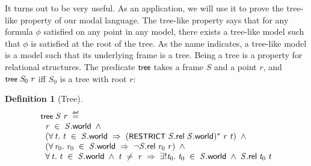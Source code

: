 \documentclass[letterpaper]{article}
\newtheorem{defn}{Definition}
\renewcommand{\HOLConst}[1]{{\textsf{\upshape\small #1}}}
\renewcommand{\HOLinline}[1]{\ensuremath{#1}}
\newenvironment{holmath}{\begin{displaymath}\begin{array}{l}}{\end{array}\end{displaymath}\ignorespacesafterend}
\begin{document}
It turns out to be very useful. As an application, we will use it to prove the tree-like property of our modal language. The tree-like property says that for any formula $\phi$ satisfied on any point in any model, there exists a tree-like model such that $\phi$ is satisfied at the root of the tree. As the name indicates, a tree-like model is a model such that its underlying frame is a tree. Being a tree is a property for relational structures. The predicate \HOLinline{\HOLConst{tree}} takes a frame $S$ and a point $r$, and \HOLinline{\HOLConst{tree}\;\HOLFreeVar{S\sb{\mathrm{0}}}\;\HOLFreeVar{r}} iff $S_0$ is a tree with root $r$:
\begin{defn}[Tree]
\begin{holmath}
   \HOLConst{tree}\;\HOLFreeVar{S}\;\HOLFreeVar{r}\;\HOLSymConst{\HOLTokenDefEquality{}}\\
\;\;\HOLFreeVar{r}\;\HOLSymConst{\HOLTokenIn{}}\;\HOLFreeVar{S}.\HOLFieldName{world}\;\HOLSymConst{\HOLTokenConj{}}\\
\;\;(\HOLSymConst{\HOLTokenForall{}}\HOLBoundVar{t}.\;\HOLBoundVar{t}\;\HOLSymConst{\HOLTokenIn{}}\;\HOLFreeVar{S}.\HOLFieldName{world}\;\HOLSymConst{\HOLTokenImp{}}\;(\HOLConst{RESTRICT}\;\HOLFreeVar{S}.\HOLFieldName{rel}\;\HOLFreeVar{S}.\HOLFieldName{world})\HOLSymConst{\HOLTokenSupStar{}}\;\HOLFreeVar{r}\;\HOLBoundVar{t})\;\HOLSymConst{\HOLTokenConj{}}\\
\;\;(\HOLSymConst{\HOLTokenForall{}}\HOLBoundVar{r\sb{\mathrm{0}}}.\;\HOLBoundVar{r\sb{\mathrm{0}}}\;\HOLSymConst{\HOLTokenIn{}}\;\HOLFreeVar{S}.\HOLFieldName{world}\;\HOLSymConst{\HOLTokenImp{}}\;\HOLSymConst{\HOLTokenNeg{}}\HOLFreeVar{S}.\HOLFieldName{rel}\;\HOLBoundVar{r\sb{\mathrm{0}}}\;\HOLFreeVar{r})\;\HOLSymConst{\HOLTokenConj{}}\\
\;\;\HOLSymConst{\HOLTokenForall{}}\HOLBoundVar{t}.\;\HOLBoundVar{t}\;\HOLSymConst{\HOLTokenIn{}}\;\HOLFreeVar{S}.\HOLFieldName{world}\;\HOLSymConst{\HOLTokenConj{}}\;\HOLBoundVar{t}\;\HOLSymConst{\HOLTokenNotEqual{}}\;\HOLFreeVar{r}\;\HOLSymConst{\HOLTokenImp{}}\;\HOLSymConst{\HOLTokenUnique{}}\HOLBoundVar{t\sb{\mathrm{0}}}.\;\HOLBoundVar{t\sb{\mathrm{0}}}\;\HOLSymConst{\HOLTokenIn{}}\;\HOLFreeVar{S}.\HOLFieldName{world}\;\HOLSymConst{\HOLTokenConj{}}\;\HOLFreeVar{S}.\HOLFieldName{rel}\;\HOLBoundVar{t\sb{\mathrm{0}}}\;\HOLBoundVar{t}
\end{holmath}
\end{defn}
\end{document}
